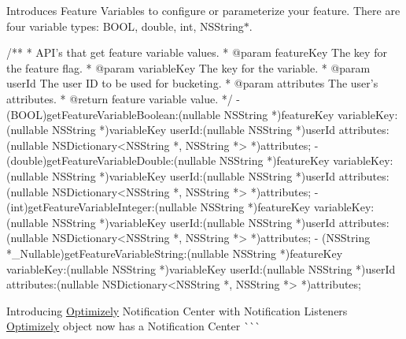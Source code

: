 \begin{DoxyItemize}
\item Introduces Feature Variables to configure or parameterize your feature. There are four variable types\+: {\ttfamily B\+O\+OL}, {\ttfamily double}, {\ttfamily int}, {\ttfamily N\+S\+String$\ast$}. 
\begin{DoxyCode}
/**
 * API's that get feature variable values.
 * @param featureKey The key for the feature flag.
 * @param variableKey The key for the variable.
 * @param userId The user ID to be used for bucketing.
 * @param attributes The user's attributes.
 * @return feature variable value.
 */
- (BOOL)getFeatureVariableBoolean:(nullable NSString *)featureKey
                      variableKey:(nullable NSString *)variableKey
                           userId:(nullable NSString *)userId
                       attributes:(nullable NSDictionary<NSString *, NSString *> *)attributes;
- (double)getFeatureVariableDouble:(nullable NSString *)featureKey
                       variableKey:(nullable NSString *)variableKey
                            userId:(nullable NSString *)userId
                        attributes:(nullable NSDictionary<NSString *, NSString *> *)attributes;
- (int)getFeatureVariableInteger:(nullable NSString *)featureKey
                     variableKey:(nullable NSString *)variableKey
                          userId:(nullable NSString *)userId
                      attributes:(nullable NSDictionary<NSString *, NSString *> *)attributes;
- (NSString *\_Nullable)getFeatureVariableString:(nullable NSString *)featureKey
                           variableKey:(nullable NSString *)variableKey
                                userId:(nullable NSString *)userId
                            attributes:(nullable NSDictionary<NSString *, NSString *> *)attributes;
\end{DoxyCode}

\item Introducing \mbox{\hyperlink{interface_optimizely}{Optimizely}} Notification Center with Notification Listeners \mbox{\hyperlink{interface_optimizely}{Optimizely}} object now has a Notification Center \`{}\`{}\`{} 
\end{DoxyItemize}